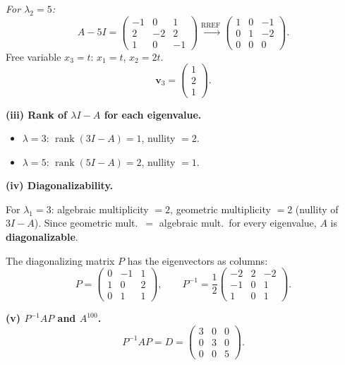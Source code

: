 \documentclass[12pt,a3paper]{article}
\begin{document}
\begin{tcolorbox}
\textit{For $\lambda_2 = 5$:}
\[
  A - 5I = \begin{pmatrix}-1&0&1\\2&-2&2\\1&0&-1\end{pmatrix}
  \xrightarrow{\text{RREF}}
  \begin{pmatrix}1&0&-1\\0&1&-2\\0&0&0\end{pmatrix}.
\]
Free variable $x_3 = t$: $x_1 = t$, $x_2 = 2t$.
\[
  \mathbf{v}_3 = \begin{pmatrix}1\\2\\1\end{pmatrix}.
\]
 
\medskip
\textbf{(iii) Rank of $\lambda I - A$ for each eigenvalue.}
\begin{itemize}[itemsep=2pt]
  \item $\lambda = 3$: $\operatorname{rank}(3I-A) = 1$, \quad nullity $= 2$.
  \item $\lambda = 5$: $\operatorname{rank}(5I-A) = 2$, \quad nullity $= 1$.
\end{itemize}
 
\medskip
\textbf{(iv) Diagonalizability.}
 
For $\lambda_1=3$: algebraic multiplicity $= 2$, geometric multiplicity $= 2$ (nullity of $3I-A$).
Since geometric mult.\ $=$ algebraic mult.\ for every eigenvalue, $A$ is
\textbf{diagonalizable}.
 
The diagonalizing matrix $P$ has the eigenvectors as columns:
\[
  P = \begin{pmatrix}0&-1&1\\1&0&2\\0&1&1\end{pmatrix}, \qquad
  P^{-1} = \frac{1}{2}\begin{pmatrix}-2&2&-2\\-1&0&1\\1&0&1\end{pmatrix}.
\]
 
\medskip
\textbf{(v) $P^{-1}AP$ and $A^{100}$.}
\[
  P^{-1}AP = D = \begin{pmatrix}3&0&0\\0&3&0\\0&0&5\end{pmatrix}.
\]
 

\end{tcolorbox}
\end{document}
